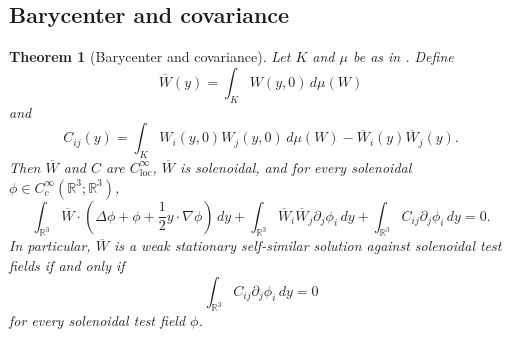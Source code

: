 \documentclass[11pt]{amsart}
\theoremstyle{plain}
\newtheorem{theorem}{Theorem}[section]
\theoremstyle{definition}
\theoremstyle{remark}
\numberwithin{equation}{section}
\newcommand{\R}{\mathbb R}
\newcommand{\loc}{\mathrm{loc}}
\begin{document}
\subsection{Barycenter and covariance}

\begin{theorem}[Barycenter and covariance]\label{p2:thm:barycenter-covariance}
Let \(K\) and \(\mu\) be as in .  Define
\[
   \overline W(y)=\int_K W(y,0)\,d\mu(W)
\]
and
\[
   C_{ij}(y)
   =
   \int_K W_i(y,0)W_j(y,0)\,d\mu(W)
   -
   \overline W_i(y)\overline W_j(y).
\]
Then \(\overline W\) and \(C\) are \(C^\infty_{\loc}\), \(\overline W\) is
solenoidal, and for every solenoidal
\(\phi\in C_c^\infty(\R^3;\R^3)\),
\begin{equation}\label{p2:eq:barycenter-covariance}
   \int_{\R^3}
   \overline W\cdot
   \left(\Delta\phi+\phi+\frac12 y\cdot\nabla\phi\right)\,dy
   +
   \int_{\R^3}
   \overline W_i\overline W_j\partial_j\phi_i\,dy
   +
   \int_{\R^3}C_{ij}\partial_j\phi_i\,dy
   =0 .
\end{equation}
In particular, \(\overline W\) is a weak stationary self-similar solution
against solenoidal test fields if and only if
\[
   \int_{\R^3}C_{ij}\partial_j\phi_i\,dy=0
\]
for every solenoidal test field \(\phi\).
\end{theorem}
\end{document}
